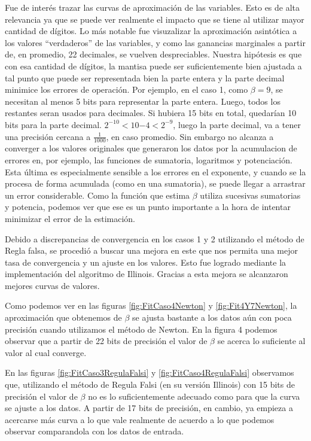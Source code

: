 Fue de inter\'es trazar las curvas de aproximaci\'on de las variables. 
Esto es de alta relevancia ya que se puede ver realmente el impacto que se tiene
al utilizar mayor cantidad de d\'igitos. Lo m\'as notable fue visuzalizar la 
aproximaci\'on asint\'otica a los valores ``verdaderos'' de las variables, 
y como las ganancias marginales a partir de, en promedio, 22 decimales, 
se vuelven despreciables. Nuestra hip\'otesis es que con esa cantidad de 
d\'igitos, la mantisa puede ser suficientemente bien ajustada a tal punto que puede 
ser representada bien la parte entera y la parte decimal minimice los errores de 
operaci\'on. Por ejemplo, en el caso 1, como $\beta = 9$, se necesitan al menos 
5 bits para representar la parte entera. Luego, todos los restantes seran usados 
para decimales. Si hubiera 15 bits en total, quedar\'ian 10 bits para la parte 
decimal. $2^{-10}<10{-4}<2^{-9}$, luego la parte decimal, va a tener una
precisi\'on cercana a $\frac{1}{1000}$, en caso promedio. 
Sin embargo no alcanza a converger a los valores originales que generaron los 
datos por la acumulacion de errores en, por ejemplo, las funciones
de sumatoria, logaritmos y potenciaci\'on. Esta \'ultima es especialmente 
sensible a los errores en el exponente, y cuando se la procesa de forma 
acumulada (como en una sumatoria), se puede llegar a arrastrar un error
considerable. Como la funci\'on que estima
$\beta$ utiliza sucesivas sumatorias y potencia, podemos ver que ese es un punto 
importante a la hora de intentar minimizar el error de la estimaci\'on.

Debido a discrepancias de convergencia en los casos 1 y 2 utilizando el m\'etodo
de Regla falsa, se procedi\'o a buscar una mejora en este que nos permita una mejor
tasa de convergencia y un ajuste en los valores. Esto fue logrado mediante la
implementaci\'on del algoritmo de Illinois. Gracias a esta mejora se alcanzaron 
mejores curvas de valores.

Como podemos ver en las figuras \ref{fig:FitCaso4Newton} y \ref{fig:Fit4Y7Newton}, la aproximaci\'on que obtenemos de $\beta$ se ajusta bastante
a los datos a\'un con poca precisi\'on cuando utilizamos el m\'etodo de Newton. En la figura 4 podemos
observar que a partir de 22 bits de precisi\'on el valor de $\beta$ se acerca lo suficiente al valor
al cual converge.

En las figuras \ref{fig:FitCaso3RegulaFalsi} y \ref{fig:FitCaso4RegulaFalsi} observamos que, utilizando el m\'etodo de Regula Falsi (en su versi\'on Illinois)
con 15 bits de precisi\'on el valor de $\beta$ no es lo suficientemente adecuado como para que la curva
se ajuste a los datos. A partir de 17 bits de precisi\'on, en cambio, ya empieza a acercarse m\'as curva
a lo que vale realmente de acuerdo a lo que podemos observar comparandola con los datos de entrada.

